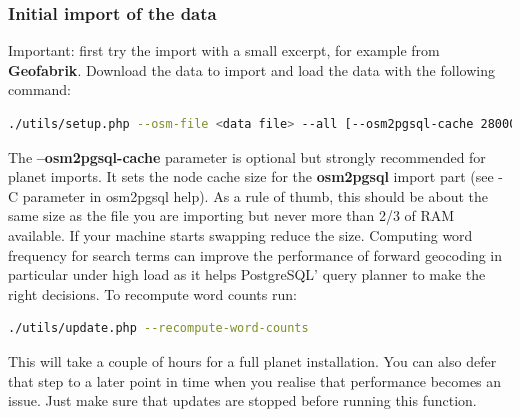 \subsubsection{Initial import of the data}
Important: first try the import with a small excerpt, for example from \textbf{Geofabrik}.
Download the data to import and load the data with the following command:
\begin{lstlisting}[language=bash,breaklines=true]
./utils/setup.php --osm-file <data file> --all [--osm2pgsql-cache 28000] 2>&1 | tee setup.log
\end{lstlisting}
The \textbf{--osm2pgsql-cache} parameter is optional but strongly recommended for planet imports. It
sets the node cache size for the \textbf{osm2pgsql} import part (see -C parameter in osm2pgsql help).
As a rule of thumb, this should be about the same size as the file you are importing but never
more than 2/3 of RAM available. If your machine starts swapping reduce the size.
Computing word frequency for search terms can improve the performance of forward geocoding
in particular under high load as it helps PostgreSQL' query planner to make the right decisions. To
recompute word counts run:
\begin{lstlisting}[language=bash,breaklines=true]
./utils/update.php --recompute-word-counts
\end{lstlisting}
This will take a couple of hours for a full planet installation. You can also defer that step to a
later point in time when you realise that performance becomes an issue. Just make sure that
updates are stopped before running this function.
